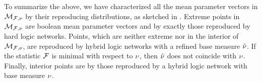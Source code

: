
To summarize the above, we have characterized all the mean parameter vectors in $\mathcal{M}_{\mathcal{F},\nu}$ by their reproducing distributions, as sketched in .
Extreme points in $\mathcal{M}_{\mathcal{F},\nu}$ are boolean mean parameter vectors and by  exactly those reproduced by hard logic networks.
Points, which are neither extreme nor in the interior of $\mathcal{M}_{\mathcal{F},\nu}$, are reproduced by hybrid logic networks with a refined base measure $\tilde{\nu}$. %
If the statistic $\mathcal{F}$ is minimal with respect to $\nu$, then $\tilde{\nu}$ does not coincide with $\nu$.
Finally, interior points are by  those reproduced by a hybrid logic network with base measure $\nu$.


